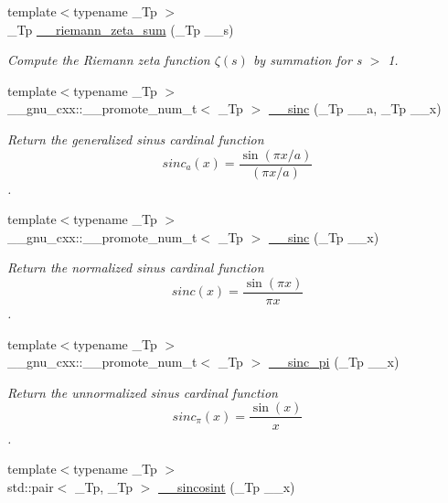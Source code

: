 \begin{DoxyCompactItemize}
{\footnotesize template$<$typename \+\_\+\+Tp $>$ }\\\+\_\+\+Tp \hyperlink{namespacestd_1_1____detail_a417dc216465f02bb7ef055fa0e4e1f0b}{\+\_\+\+\_\+riemann\+\_\+zeta\+\_\+sum} (\+\_\+\+Tp \+\_\+\+\_\+s)
\begin{DoxyCompactList}\small\item\em Compute the Riemann zeta function $ \zeta(s) $ by summation for s $>$ 1. \end{DoxyCompactList}\item 
{\footnotesize template$<$typename \+\_\+\+Tp $>$ }\\\+\_\+\+\_\+gnu\+\_\+cxx\+::\+\_\+\+\_\+promote\+\_\+num\+\_\+t$<$ \+\_\+\+Tp $>$ \hyperlink{namespacestd_1_1____detail_a9e41dd3ccf80f2ae7d97884a05d1e655}{\+\_\+\+\_\+sinc} (\+\_\+\+Tp \+\_\+\+\_\+a, \+\_\+\+Tp \+\_\+\+\_\+x)
\begin{DoxyCompactList}\small\item\em Return the generalized sinus cardinal function \[ sinc_a(x) = \frac{\sin(\pi x / a)}{(\pi x / a)} \]. \end{DoxyCompactList}\item 
{\footnotesize template$<$typename \+\_\+\+Tp $>$ }\\\+\_\+\+\_\+gnu\+\_\+cxx\+::\+\_\+\+\_\+promote\+\_\+num\+\_\+t$<$ \+\_\+\+Tp $>$ \hyperlink{namespacestd_1_1____detail_a9f8f6825e93d90df952c350d56b6a6c7}{\+\_\+\+\_\+sinc} (\+\_\+\+Tp \+\_\+\+\_\+x)
\begin{DoxyCompactList}\small\item\em Return the normalized sinus cardinal function \[ sinc(x) = \frac{\sin(\pi x)}{\pi x} \]. \end{DoxyCompactList}\item 
{\footnotesize template$<$typename \+\_\+\+Tp $>$ }\\\+\_\+\+\_\+gnu\+\_\+cxx\+::\+\_\+\+\_\+promote\+\_\+num\+\_\+t$<$ \+\_\+\+Tp $>$ \hyperlink{namespacestd_1_1____detail_ae4c7989f431b5f7f0e972d4ebd2c6d55}{\+\_\+\+\_\+sinc\+\_\+pi} (\+\_\+\+Tp \+\_\+\+\_\+x)
\begin{DoxyCompactList}\small\item\em Return the unnormalized sinus cardinal function \[ sinc_\pi(x) = \frac{\sin(x)}{x} \]. \end{DoxyCompactList}\item 
{\footnotesize template$<$typename \+\_\+\+Tp $>$ }\\std\+::pair$<$ \+\_\+\+Tp, \+\_\+\+Tp $>$ \hyperlink{namespacestd_1_1____detail_a53bf807a99eef68cdb6f917c7ca085bf}{\+\_\+\+\_\+sincosint} (\+\_\+\+Tp \+\_\+\+\_\+x)

\end{DoxyCompactItemize}
